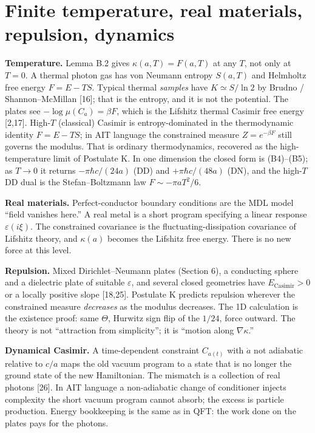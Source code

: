 \documentclass[11pt,letterpaper]{article}
\begin{document}
\section{Finite temperature, real materials, repulsion, dynamics}


\textbf{Temperature.} Lemma B.2 gives \(\kappa(a,T)=F(a,T)\) at any \(T\), not only at \(T=0\). A thermal photon gas has von Neumann entropy \(S(a,T)\) and Helmholtz free energy \(F=E-TS\). Typical thermal \emph{samples} have \(K\simeq S/\ln 2\) by Brudno / Shannon–McMillan [16]; that is the entropy, and it is not the potential. The plates see \(-\log\mu(C_a)= \beta F\), which is the Lifshitz thermal Casimir free energy [2,17]. High-\(T\) (classical) Casimir is entropy-dominated in the thermodynamic identity \(F=E-TS\); in AIT language the constrained measure \(Z=e^{-\beta F}\) still governs the modulus. That is ordinary thermodynamics, recovered as the high-temperature limit of Postulate K. In one dimension the closed form is (B4)–(B5); as \(T\to 0\) it returns \(-\pi\hbar c/(24a)\) (DD) and \(+\pi\hbar c/(48a)\) (DN), and the high-\(T\) DD dual is the Stefan–Boltzmann law \(F\sim -\pi a T^{2}/6\).


\textbf{Real materials.} Perfect-conductor boundary conditions are the MDL model “field vanishes here.” A real metal is a short program specifying a linear response \(\varepsilon(i\xi)\). The constrained covariance is the fluctuating-dissipation covariance of Lifshitz theory, and \(\kappa(a)\) becomes the Lifshitz free energy. There is no new force at this level.


\textbf{Repulsion.} Mixed Dirichlet–Neumann plates (Section 6), a conducting sphere and a dielectric plate of suitable \(\varepsilon\), and several closed geometries have \(E_{\mathrm{Casimir}}>0\) or a locally positive slope [18,25]. Postulate K predicts repulsion wherever the constrained measure \emph{decreases} as the modulus decreases. The 1D calculation is the existence proof: same \(\Theta\), Hurwitz sign flip of the \(1/24\), force outward. The theory is not “attraction from simplicity”; it is “motion along \(\nabla\kappa\).”


\textbf{Dynamical Casimir.} A time-dependent constraint \(C_{a(t)}\) with \(\dot a\) not adiabatic relative to \(c/a\) maps the old vacuum program to a state that is no longer the ground state of the new Hamiltonian. The mismatch is a collection of real photons [26]. In AIT language a non-adiabatic change of conditioner injects complexity the short vacuum program cannot absorb; the excess is particle production. Energy bookkeeping is the same as in QFT: the work done on the plates pays for the photons.
\end{document}
